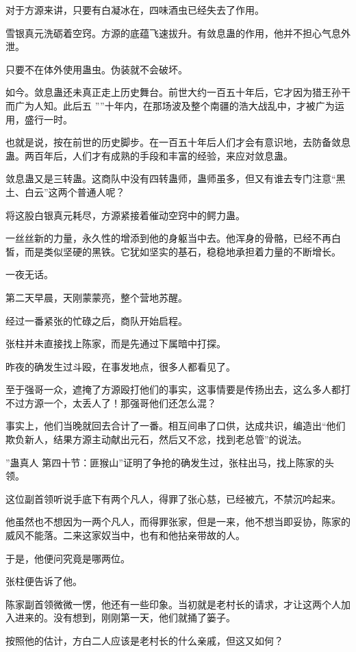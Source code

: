 \begin{this_body}
对于方源来讲，只要有白凝冰在，四味酒虫已经失去了作用。

雪银真元洗砺着空窍。方源的底蕴飞速拔升。有敛息蛊的作用，他并不担心气息外泄。

只要不在体外使用蛊虫。伪装就不会破坏。

如今。敛息蛊还未真正走上历史舞台。前世大约一百五十年后，它才因为猎王孙干而广为人知。此后五 ””十年内，在那场波及整个南疆的浩大战乱中，才被广为运用，盛行一时。

也就是说，按在前世的历史脚步。在一百五十年后人们才会有意识地，去防备敛息蛊。两百年后，人们才有成熟的手段和丰富的经验，来应对敛息蛊。

敛息蛊又是三转蛊。这商队中没有四转蛊师，蛊师虽多，但又有谁去专门注意“黑土、白云”这两个普通人呢？

将这股白银真元耗尽，方源紧接着催动空窍中的鳄力蛊。

一丝丝新的力量，永久性的增添到他的身躯当中去。他浑身的骨骼，已经不再白皙，而是类似坚硬的黑铁。它犹如坚实的基石，稳稳地承担着力量的不断增长。

一夜无话。

第二天早晨，天刚蒙蒙亮，整个营地苏醒。

经过一番紧张的忙碌之后，商队开始启程。

张柱并未直接找上陈家，而是先通过下属暗中打探。

昨夜的确发生过斗殴，在事发地点，很多人都看见了。

至于强哥一众，遮掩了方源殴打他们的事实，这事情要是传扬出去，这么多人都打不过方源一个，太丢人了！那强哥他们还怎么混？

事实上，他们当晚就回去合计了一番。相互间串了口供，达成共识，编造出“他们欺负新人，结果方源主动献出元石，然后又不忿，找到老总管”的说法。

”蛊真人 第四十节：匪猴山”证明了争抢的确发生过，张柱出马，找上陈家的头领。

这位副首领听说手底下有两个凡人，得罪了张心慈，已经被亢，不禁沉吟起来。

他虽然也不想因为一两个凡人，而得罪张家，但是一来，他不想当即妥协，陈家的威风不能落。二来这家奴当中，也有和他拈亲带故的人。

于是，他便问究竟是哪两位。

张柱便告诉了他。

陈家副首领微微一愣，他还有一些印象。当初就是老村长的请求，才让这两个人加入进来的。没有想到，刚刚第一天，他们就捅了篓子。

按照他的估计，方白二人应该是老村长的什么亲戚，但这又如何？


\end{this_body}
